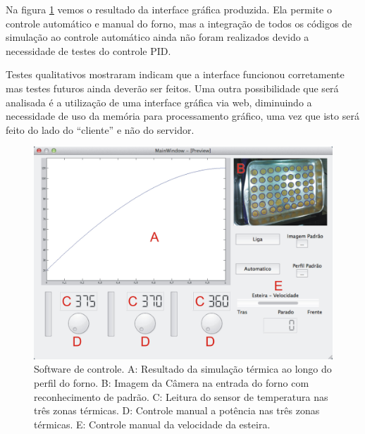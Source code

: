 Na figura \ref{fig:gui_control} vemos o resultado da interface gráfica produzida. Ela permite o controle automático e manual do forno, mas a integração de todos os códigos de simulação ao controle automático ainda não foram realizados devido a necessidade de testes do controle PID. 

Testes qualitativos mostraram indicam que a interface funcionou corretamente mas testes futuros ainda deverão ser feitos. Uma outra possibilidade que será analisada é a utilização de uma interface gráfica via web, diminuindo a necessidade de uso da memória para processamento gráfico, uma vez que isto será feito do lado do “cliente” e não do servidor. 

\begin{figure}[H]
\centering
\includegraphics[width=\textwidth]{Figuras/gui_control2}
\caption{Software de controle. A: Resultado da simulação térmica ao longo do perfil do forno. B: Imagem da Câmera na entrada do forno com reconhecimento de padrão. C: Leitura do sensor de temperatura nas três zonas térmicas. D: Controle manual a potência nas três zonas térmicas. E: Controle manual da velocidade da esteira.}
\label{fig:gui_control}
\end{figure}






















